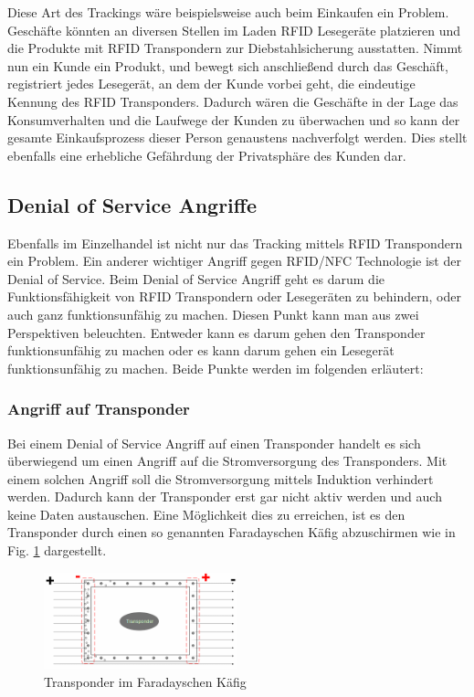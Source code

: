 \documentclass[conference]{IEEEtran}
\begin{document}
Diese Art des Trackings wäre beispielsweise auch beim Einkaufen ein Problem. Geschäfte könnten an diversen Stellen im Laden RFID Lesegeräte platzieren und die Produkte mit RFID Transpondern zur Diebstahlsicherung ausstatten. Nimmt nun ein Kunde ein Produkt, und bewegt sich anschließend durch das Geschäft, registriert jedes Lesegerät, an dem der Kunde vorbei geht, die eindeutige Kennung des RFID Transponders. Dadurch wären die Geschäfte in der Lage das Konsumverhalten und die Laufwege der Kunden zu überwachen und so kann der gesamte Einkaufsprozess dieser Person genaustens nachverfolgt werden. Dies stellt ebenfalls eine erhebliche Gefährdung der Privatsphäre des Kunden dar.

\subsection{Denial of Service Angriffe}
Ebenfalls im Einzelhandel ist nicht nur das Tracking mittels RFID Transpondern ein Problem. Ein anderer wichtiger Angriff gegen RFID/NFC Technologie ist der Denial of Service. Beim Denial of Service Angriff geht es darum die Funktionsfähigkeit von RFID Transpondern oder Lesegeräten zu behindern, oder auch ganz funktionsunfähig zu machen. Diesen Punkt kann man aus zwei Perspektiven beleuchten. Entweder kann es darum gehen den Transponder funktionsunfähig zu machen oder es kann darum gehen ein Lesegerät funktionsunfähig zu machen. Beide Punkte werden im folgenden erläutert:

\subsubsection{Angriff auf Transponder}
Bei einem Denial of Service Angriff auf einen Transponder handelt es sich überwiegend um einen Angriff auf die Stromversorgung des Transponders. Mit einem solchen Angriff soll die Stromversorgung mittels Induktion verhindert werden. Dadurch kann der Transponder erst gar nicht aktiv werden und auch keine Daten austauschen. Eine Möglichkeit dies zu erreichen, ist es den Transponder durch einen so genannten Faradayschen Käfig abzuschirmen wie in Fig. \ref{fig2} dargestellt.

\begin{figure}[htbp]
\centerline{\includegraphics[width=0.5\textwidth]{img/kaefig.png}}
\caption{Transponder im Faradayschen Käfig \cite{b7}}
\label{fig2}
\end{figure}
\end{document}
